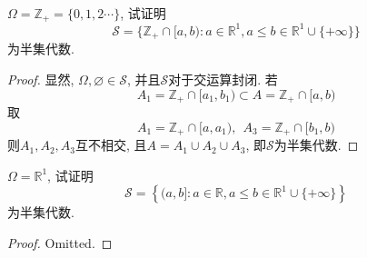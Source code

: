 \begin{example}
	$\Omega = \mathbb{Z}_+ = \{0,1,2\cdots\}$, 试证明
	\begin{equation}
	\mathscr{S} = \{\mathbb{Z}_+\cap [a,b):a\in\mathbb{R}^{1},a\leqslant b\in\mathbb{R}^{1}\cup\{+\infty\}\}
	\end{equation}
	为半集代数.
	\begin{proof}
		显然, $\Omega,\varnothing\in\mathscr{S}$, 并且$\mathscr{S}$对于交运算封闭. 若
		\begin{equation}
		A_1 = \mathbb{Z}_+\cap [a_1,b_1) \subset A = \mathbb{Z}_+\cap [a,b)
		\end{equation}
		取\begin{equation}
		A_1 = \mathbb{Z}_+\cap [a,a_1),~~ 
		A_3 = \mathbb{Z}_+\cap [b_1,b)
		\end{equation}
		则$A_1,A_2,A_3$互不相交, 且$A = A_1\cup A_2\cup A_3$, 即$\mathscr{S}$为半集代数.
	\end{proof}
\end{example}

\begin{example}
	$\Omega = \mathbb{R}^{1}$, 试证明
	\begin{equation}
	\mathscr{S} = \left\{ (a,b]:a\in\mathbb{R}, a\leqslant b\in\mathbb{R}^{1}\cup \{+\infty\}  \right\}
	\end{equation}
	为半集代数.
	\begin{proof}
		Omitted.
	\end{proof}
\end{example}

